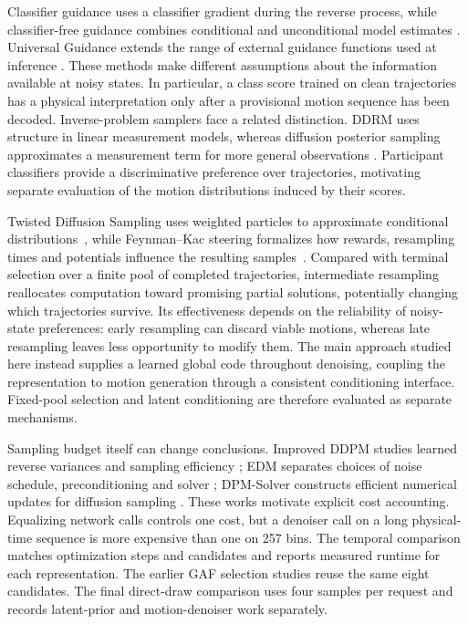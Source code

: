 Classifier guidance uses a classifier gradient during the reverse process, while classifier-free guidance combines conditional and unconditional model estimates \cite{cg,cfg}. Universal Guidance extends the range of external guidance functions used at inference \cite{univ}. These methods make different assumptions about the information available at noisy states. In particular, a class score trained on clean trajectories has a physical interpretation only after a provisional motion sequence has been decoded. Inverse-problem samplers face a related distinction. DDRM uses structure in linear measurement models, whereas diffusion posterior sampling approximates a measurement term for more general observations \cite{ddrm,dps}. Participant classifiers provide a discriminative preference over trajectories, motivating separate evaluation of the motion distributions induced by their scores.

Twisted Diffusion Sampling uses weighted particles to approximate conditional distributions~\cite{tds}, while Feynman--Kac steering formalizes how rewards, resampling times and potentials influence the resulting samples~\cite{fk}. Compared with terminal selection over a finite pool of completed trajectories, intermediate resampling reallocates computation toward promising partial solutions, potentially changing which trajectories survive. Its effectiveness depends on the reliability of noisy-state preferences: early resampling can discard viable motions, whereas late resampling leaves less opportunity to modify them. The main approach studied here instead supplies a learned global code throughout denoising, coupling the representation to motion generation through a consistent conditioning interface. Fixed-pool selection and latent conditioning are therefore evaluated as separate mechanisms.

Sampling budget itself can change conclusions. Improved DDPM studies learned reverse variances and sampling efficiency \cite{idh}; EDM separates choices of noise schedule, preconditioning and solver \cite{edm}; DPM-Solver constructs efficient numerical updates for diffusion sampling \cite{dpm}. These works motivate explicit cost accounting. Equalizing network calls controls one cost, but a denoiser call on a long physical-time sequence is more expensive than one on 257 bins. The temporal comparison matches optimization steps and candidates and reports measured runtime for each representation. The earlier GAF selection studies reuse the same eight candidates. The final direct-draw comparison uses four samples per request and records latent-prior and motion-denoiser work separately.

